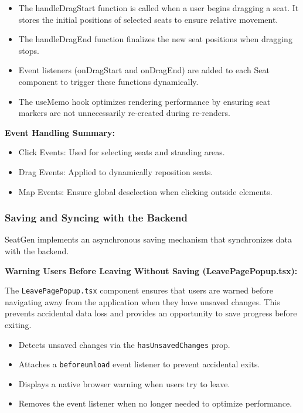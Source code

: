 \begin{itemize}
    \item The handleDragStart function is called when a user begins dragging a seat. It stores the initial positions of selected seats to ensure relative movement.
    \item The handleDragEnd function finalizes the new seat positions when dragging stops.
    \item Event listeners (onDragStart and onDragEnd) are added to each Seat component to trigger these functions dynamically.
    \item The useMemo hook optimizes rendering performance by ensuring seat markers are not unnecessarily re-created during re-renders.
\end{itemize}

\textbf{Event Handling Summary:}
\begin{itemize}
    \item Click Events: Used for selecting seats and standing areas.
    \item Drag Events: Applied to dynamically reposition seats.
    \item Map Events: Ensure global deselection when clicking outside elements.
\end{itemize}

\subsubsection{Saving and Syncing with the Backend}
SeatGen implements an asynchronous saving mechanism that synchronizes data with the backend.

\textbf{Warning Users Before Leaving Without Saving (LeavePagePopup.tsx):}

The \texttt{LeavePagePopup.tsx} component ensures that users are warned before navigating away from the application when they have unsaved changes. This prevents accidental data loss and provides an opportunity to save progress before exiting.

\begin{itemize}
    \item Detects unsaved changes via the \texttt{hasUnsavedChanges} prop.
    \item Attaches a \texttt{beforeunload} event listener to prevent accidental exits.
    \item Displays a native browser warning when users try to leave.
    \item Removes the event listener when no longer needed to optimize performance.
\end{itemize}

